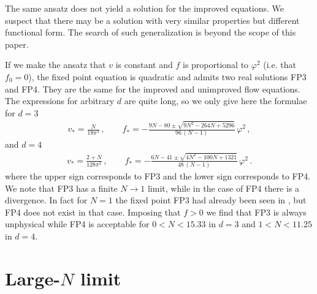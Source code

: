\documentclass[11pt]{book} %
\begin{document}
The same ansatz does not yield a solution for the improved equations.
We suspect that there may be a solution
with very similar properties but different functional form.
The search of such generalization is beyond the scope of this paper.

If we make the ansatz that $v$ is constant and $f$ is proportional
to $\varphi^2$ (i.e. that $f_0=0$), the fixed point equation is quadratic and admits two
real solutions FP3 and FP4.
They are the same for the improved and unimproved flow equations.
The expressions for arbitrary $d$ are quite long, so
we only give here the formulae for $d=3$
\begin{align}
  v_* = \frac{N}{18\pi^2} \,, \qquad
  f_* = - \frac{ 9N - 80 \pm \sqrt{9N^2-264N+5296} }{ 96 \, (N-1) } \, \varphi^2 \,,
\end{align}
and $d=4$
\begin{align}
  v_* = \frac{2+N}{128\pi^2} \,, \qquad
  f_* = - \frac{ 6N - 41 \pm \sqrt{4N^2-100N+1321} }{ 48 \, (N-1) } \, \varphi^2 \,.
\end{align}
where the upper sign corresponds to FP3
and the lower sign corresponds to FP4.
We note that FP3 has a finite $N\to1$ limit,
while in the case of FP4 there is a divergence.
In fact for $N=1$ the fixed point FP3 had already been seen
in \cite{Percacci:2015wwa}, but FP4 does not exist in that case.
Imposing that $f>0$ we find that FP3 is always unphysical
while FP4 is acceptable for $0<N<15.33$ in $d=3$
and $1<N<11.25$ in $d=4$.


\section{Large-$N$ limit}
\end{document}
